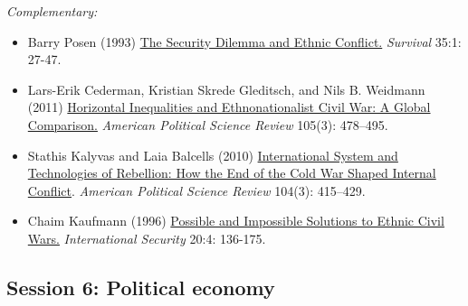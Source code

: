 \documentclass[12pt, a4paper]{article}
\begin{document}
\vspace{10pt}

\noindent\textit{Complementary:}

\begin{itemize}
  \item Barry Posen (1993) \href{https://doi.org/10.1080/00396339308442672}{The Security Dilemma and Ethnic Conflict.} \textit{Survival} 35:1: 27-47.
  \item Lars-Erik Cederman, Kristian Skrede Gleditsch, and Nils B. Weidmann (2011) \href{https://doi.org/10.1017/S0003055411000207}{Horizontal Inequalities and Ethnonationalist Civil War: A Global Comparison.} \textit{American Political Science Review} 105(3): 478--495.
  \item Stathis Kalyvas and Laia Balcells (2010) \href{https://doi.org/10.1017/S0003055410000286}{International System and Technologies of Rebellion: How the End of the Cold War Shaped Internal Conflict}. \textit{American Political Science Review} 104(3): 415--429.
	\item Chaim Kaufmann (1996) \href{https://doi.org/10.1162/isec.20.4.136}{Possible and Impossible Solutions to Ethnic Civil Wars.} \textit{International Security} 20:4: 136-175.
\end{itemize}


\vspace{20pt}
\hline
\subsection*{Session 6: Political economy}
\end{document}
